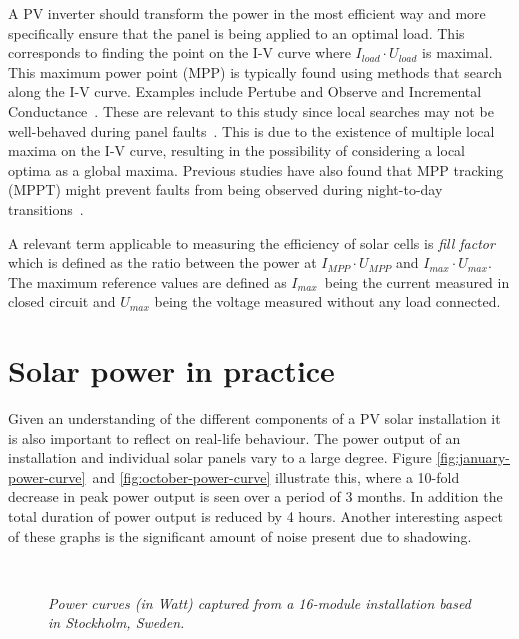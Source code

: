 A PV inverter should transform the power in the most efficient way and more specifically ensure that the panel is being applied to an optimal load.
This corresponds to finding the point on the I-V curve where $I_{load} \cdot U_{load}$ is maximal.
This maximum power point (MPP) is typically found using methods that search along the I-V curve.
Examples include Pertube and Observe and Incremental Conductance~\cite{Roman2006}.
These are relevant to this study since local searches may not be well-behaved during panel faults~\cite{Roman2006}.
This is due to the existence of multiple local maxima on the I-V curve, resulting in the possibility of considering a local optima as a global maxima.
Previous studies have also found that MPP tracking (MPPT) might prevent faults from being observed during night-to-day transitions~\cite{Zhao2010night}.

A relevant term applicable to measuring the efficiency of solar cells is \emph{fill factor} which is defined as the ratio between the power at $I_{MPP} \cdot U_{MPP}$ and $I_{max} \cdot U_{max}$.
The maximum reference values are defined as $I_{max}$ being the current measured in closed circuit and $U_{max}$ being the voltage measured without any load connected.


\section{Solar power in practice}
Given an understanding of the different components of a PV solar installation it is also important to reflect on real-life behaviour.
The power output of an installation and individual solar panels vary to a large degree.
Figure \ref{fig:january-power-curve} and \ref{fig:october-power-curve} illustrate this, where a 10-fold decrease in peak power output is seen over a period of 3 months.
In addition the total duration of power output is reduced by 4 hours.
Another interesting aspect of these graphs is the significant amount of noise present due to shadowing.

\begin{figure}[here]
\centering
{}
~
\caption[Power curves captured from an installation]{\emph{Power curves (in Watt) captured from a 16-module installation based in Stockholm, Sweden.}}
\end{figure}

